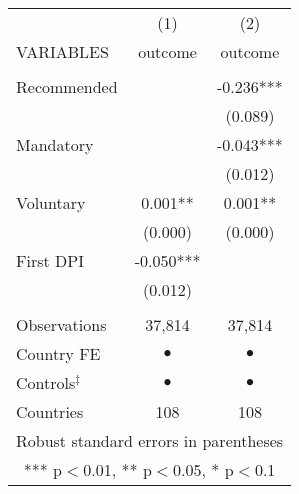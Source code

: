 \begin{tabular}{lcc} \hline
 & (1) & (2) \\
VARIABLES & outcome & outcome \\ \hline
 &  &  \\
Recommended &  & -0.236*** \\
 &  & (0.089) \\
Mandatory &  & -0.043*** \\
 &  & (0.012) \\
Voluntary & 0.001** & 0.001** \\
 & (0.000) & (0.000) \\
First DPI & -0.050*** &  \\
 & (0.012) &  \\
 &  &  \\
Observations & 37,814 & 37,814 \\
Country FE & $ \bullet $ & $ \bullet $ \\
Controls$^\ddag$ & $ \bullet $ & $ \bullet $ \\
 Countries & 108 & 108 \\ \hline
\multicolumn{3}{c}{ Robust standard errors in parentheses} \\
\multicolumn{3}{c}{ *** p$<$0.01, ** p$<$0.05, * p$<$0.1} \\
\end{tabular}
